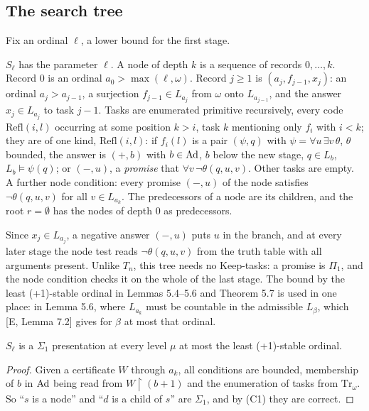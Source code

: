 \documentclass[11pt]{article}
\begin{document}
\subsection{The search tree}

Fix an ordinal $\ell$, a lower bound for the first stage.

\begin{statement} $S_\ell$ has the parameter $\ell$. A node of depth $k$ is a
sequence of records $0, \dots, k$. Record 0 is an ordinal $a_0 > \max(\ell, \omega)$. Record $j \ge 1$ is $(a_j,
f_{j-1}, x_j)$: an ordinal $a_j > a_{j-1}$, a surjection $f_{j-1} \in L_{a_j}$ from $\omega$ onto $L_{a_{j-1}}$, and
the answer $x_j \in L_{a_j}$ to task $j-1$. Tasks are enumerated primitive recursively, every code $\mathrm{Refl}(i,l)$
occurring at some position $k > i$, task $k$ mentioning only $f_i$ with $i < k$; they are of one kind,
$\mathrm{Refl}(i,l)$: if $f_i(l)$ is a pair $(\psi, q)$ with $\psi = \forall u\, \exists v\, \theta$, $\theta$
bounded, the answer is $(+, b)$ with $b \in \mathrm{Ad}$, $b$ below the new stage, $q \in L_b$, $L_b \models \psi(q)$; or $(-,
u)$, a \emph{promise} that $\forall v\, \neg\theta(q,u,v)$. Other tasks are empty. A further node condition: every
promise $(-, u)$ of the node satisfies $\neg\theta(q,u,v)$ for all $v \in L_{a_k}$. The predecessors of a node are its
children, and the root $r = \emptyset$ has the nodes of depth 0 as predecessors.
\end{statement}

Since $x_j \in L_{a_j}$, a negative answer $(-,u)$ puts $u$ in the branch, and at every later stage the node test reads
$\neg\theta(q, u, v)$ from the truth table with all arguments present. Unlike $T_n$, this tree needs no Keep-tasks: a
promise is $\Pi_1$, and the node condition checks it on the whole of the last stage. The bound by the least
(+1)-stable ordinal in Lemmas 5.4--5.6 and Theorem 5.7 is used in one place: in Lemma 5.6, where $L_{a_k}$ must be
countable in the admissible $L_\beta$, which [E, Lemma 7.2] gives for $\beta$ at most that ordinal.

\begin{statement} $S_\ell$ is a $\Sigma_1$ presentation at every level $\mu$ at most the least
(+1)-stable ordinal.
\end{statement}

\begin{proof}
Given a certificate $W$ through $a_k$, all conditions are bounded, membership of $b$ in $\mathrm{Ad}$ being read from
$W{\restriction}(b+1)$ and the enumeration of tasks from $\mathrm{Tr}_\omega$. So ``$s$ is a node'' and ``$d$ is a
child of $s$'' are $\Sigma_1$, and by (C1) they are correct.
\end{proof}
\end{document}
